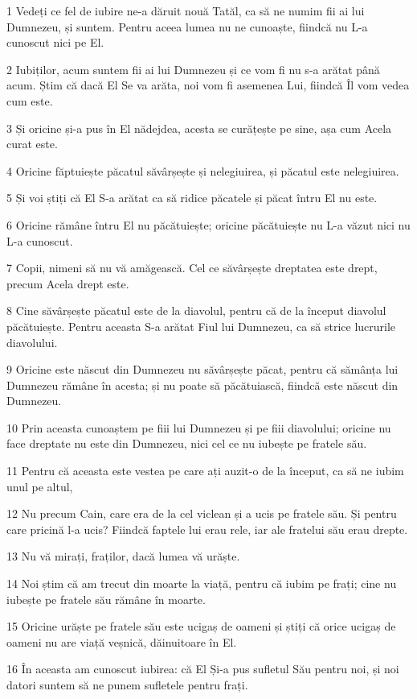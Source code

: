 \par 1 Vedeți ce fel de iubire ne-a dăruit nouă Tatăl, ca să ne numim fii ai lui Dumnezeu, și suntem. Pentru aceea lumea nu ne cunoaște, fiindcă nu L-a cunoscut nici pe El.
\par 2 Iubiților, acum suntem fii ai lui Dumnezeu și ce vom fi nu s-a arătat până acum. Știm că dacă El Se va arăta, noi vom fi asemenea Lui, fiindcă Îl vom vedea cum este.
\par 3 Și oricine și-a pus în El nădejdea, acesta se curățește pe sine, așa cum Acela curat este.
\par 4 Oricine făptuiește păcatul săvârșește și nelegiuirea, și păcatul este nelegiuirea.
\par 5 Și voi știți că El S-a arătat ca să ridice păcatele și păcat întru El nu este.
\par 6 Oricine rămâne întru El nu păcătuiește; oricine păcătuiește nu L-a văzut nici nu L-a cunoscut.
\par 7 Copii, nimeni să nu vă amăgească. Cel ce săvârșește dreptatea este drept, precum Acela drept este.
\par 8 Cine săvârșește păcatul este de la diavolul, pentru că de la început diavolul păcătuiește. Pentru aceasta S-a arătat Fiul lui Dumnezeu, ca să strice lucrurile diavolului.
\par 9 Oricine este născut din Dumnezeu nu săvârșește păcat, pentru că sămânța lui Dumnezeu rămâne în acesta; și nu poate să păcătuiască, fiindcă este născut din Dumnezeu.
\par 10 Prin aceasta cunoaștem pe fiii lui Dumnezeu și pe fiii diavolului; oricine nu face dreptate nu este din Dumnezeu, nici cel ce nu iubește pe fratele său.
\par 11 Pentru că aceasta este vestea pe care ați auzit-o de la început, ca să ne iubim unul pe altul,
\par 12 Nu precum Cain, care era de la cel viclean și a ucis pe fratele său. Și pentru care pricină l-a ucis? Fiindcă faptele lui erau rele, iar ale fratelui său erau drepte.
\par 13 Nu vă mirați, fraților, dacă lumea vă urăște.
\par 14 Noi știm că am trecut din moarte la viață, pentru că iubim pe frați; cine nu iubește pe fratele său rămâne în moarte.
\par 15 Oricine urăște pe fratele său este ucigaș de oameni și știți că orice ucigaș de oameni nu are viață veșnică, dăinuitoare în El.
\par 16 În aceasta am cunoscut iubirea: că El Și-a pus sufletul Său pentru noi, și noi datori suntem să ne punem sufletele pentru frați.
